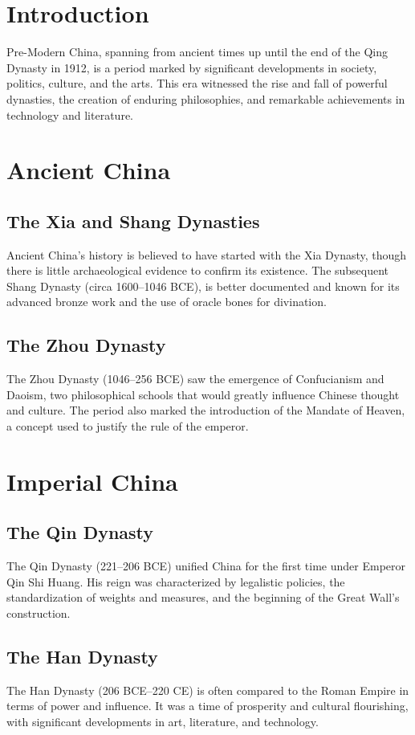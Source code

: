 \documentclass[a4paper,12pt]{book}
\begin{document}
\section{Introduction}
Pre-Modern China, spanning from ancient times up until the end of the Qing Dynasty in 1912, is a period marked by significant developments in society, politics, culture, and the arts. This era witnessed the rise and fall of powerful dynasties, the creation of enduring philosophies, and remarkable achievements in technology and literature.

\section{Ancient China}
\subsection{The Xia and Shang Dynasties}
Ancient China’s history is believed to have started with the Xia Dynasty, though there is little archaeological evidence to confirm its existence. The subsequent Shang Dynasty (circa 1600–1046 BCE), is better documented and known for its advanced bronze work and the use of oracle bones for divination.

\subsection{The Zhou Dynasty}
The Zhou Dynasty (1046–256 BCE) saw the emergence of Confucianism and Daoism, two philosophical schools that would greatly influence Chinese thought and culture. The period also marked the introduction of the Mandate of Heaven, a concept used to justify the rule of the emperor.

\section{Imperial China}
\subsection{The Qin Dynasty}
The Qin Dynasty (221–206 BCE) unified China for the first time under Emperor Qin Shi Huang. His reign was characterized by legalistic policies, the standardization of weights and measures, and the beginning of the Great Wall’s construction.

\subsection{The Han Dynasty}
The Han Dynasty (206 BCE–220 CE) is often compared to the Roman Empire in terms of power and influence. It was a time of prosperity and cultural flourishing, with significant developments in art, literature, and technology.
\end{document}
